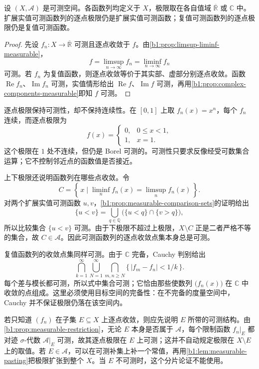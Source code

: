 \begin{proposition}
\label{b1:prop:pointwise-limit-measurable}
设 \((X,\mathcal A)\) 是可测空间。各函数列均定义于 \(X\)，极限取在各自值域 \(\overline{\mathbb R}\) 或 \(\mathbb C\) 中。扩展实值可测函数列的逐点极限仍是扩展实值可测函数；复值可测函数列的逐点极限仍是复值可测函数。
\end{proposition}
\begin{proof}
先设 \(f_n:X\rightarrow\overline{\mathbb R}\) 可测且逐点收敛于 \(f\)。由\cref{b1:prop:limsup-liminf-measurable}，
\[
f=\limsup_{n\to\infty}f_n
=\liminf_{n\to\infty}f_n
\]
可测。若 \(f_n\) 为复值函数，则逐点收敛等价于其实部、虚部分别逐点收敛。函数 \(\operatorname{Re}f_n\)、\(\operatorname{Im}f_n\) 可测，实值情形给出 \(\operatorname{Re}f\)、\(\operatorname{Im}f\) 可测，再用\cref{b1:prop:complex-components-measurable}即知 \(f\) 可测。
\end{proof}

逐点极限保持可测性，却不保持连续性。在 \([0,1]\) 上取 \(f_n(x)=x^n\)，每个 \(f_n\) 连续，而逐点极限为
\[
f(x)=
\begin{cases}
0,&0\leq x<1,\\
1,&x=1.
\end{cases}
\]
这个极限在 \(1\) 处不连续，但仍是 Borel 可测的。可测性只要求反像经受可数集合运算；它不控制邻近点的函数值是否接近。

\ProseParagraphBreak

上下极限还说明函数列在哪些点收敛。令
\[
C=\left\{\,x\mid\liminf_nf_n(x)=\limsup_nf_n(x)\,\right\}.
\]
对两个扩展实值可测函数 \(u,v\)，\cref{b1:prop:measurable-comparison-sets}的证明给出
\[
\{u<v\}
=\bigcup_{q\in\mathbb Q}\bigl(\{u<q\}\cap\{v>q\}\bigr),
\]
所以比较集合 \(\{u<v\}\) 可测。由于下极限不超过上极限，\(X\setminus C\) 正是二者严格不等的集合，故 \(C\in\mathcal A\)。因此可测函数列的逐点收敛点集本身总是可测。

\ProseParagraphBreak

复值函数列的收敛点集同样可测。由于 \(\mathbb C\) 完备，Cauchy 判别给出
\[
\bigcap_{k=1}^{\infty}
\bigcup_{N=1}^{\infty}
\bigcap_{m,n\geq N}
\{\,|f_m-f_n|<1/k\,\}.
\]
每个差与模长都可测，所以式中集合可测；它恰由那些使数列 \(\bigl(f_n(x)\bigr)\) 在 \(\mathbb C\) 中收敛的点组成。这里必须使用目标空间的完备性：在不完备的度量空间中，Cauchy 并不保证极限仍落在该空间内。

\ProseParagraphBreak

若只知道 \((f_n)\) 在子集 \(E\subseteq X\) 上逐点收敛，则应先说明 \(E\) 所带的可测结构。由\cref{b1:prop:measurable-restriction}，无论 \(E\) 本身是否属于 \(\mathcal A\)，每个限制函数 \(f_n|_E\) 都对迹 \(\sigma\)-代数 \(\mathcal A|_E\) 可测，故其逐点极限在 \(E\) 上可测；这并不自动规定极限在 \(X\setminus E\) 上的取值。若 \(E\in\mathcal A\)，可以在可测补集上补一个常值，再用\cref{b1:lem:measurable-pasting}把极限扩张到整个 \(X\)。当 \(E\) 不可测时，这个分片论证不能使用。

